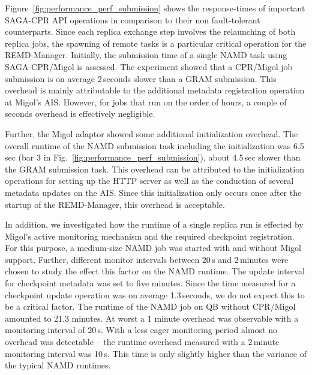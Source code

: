 \documentclass[conference,final]{IEEEtran}
\newcommand{\jhanote}[1]{ {\textcolor{red} { ***SJ: #1 }}}
\newcommand{\jhanote}[1]{}
\begin{document}
Figure~\ref{fig:performance_perf_submission} shows the response-times
of important SAGA-CPR API operations in comparison to their non
fault-tolerant counterparts. Since each replica exchange step involves
the relaunching of both replica jobs, the spawning of remote tasks is
a particular critical operation for the REMD-Manager.
Initially, the submission time of a single NAMD task
using SAGA-CPR/Migol is assessed. The experiment showed that a
CPR/Migol job submission is on average 2\,seconds slower than a 
GRAM submission. This overhead is mainly attributable to the
additional metadata registration operation at Migol's AIS. However,
for jobs that run on the order of hours, a couple of seconds overhead
is effectively negligible.

Further, the Migol adaptor showed some additional initialization
overhead. The overall runtime of the NAMD submission task
including the initialization was 6.5\,sec (bar 3 in
Fig.~\ref{fig:performance_perf_submission}), about 4.5\,sec slower than
the GRAM submission task. This overhead can be attributed to the
initialization operations for setting up the HTTP server as well as
the conduction of several metadata updates on the AIS. Since this
initialization only occurs once after the startup of the REMD-Manager,
this overhead is acceptable.
                                                                                                                    
In addition, we investigated how the runtime of
a single replica run is effected by Migol's active monitoring mechanism
and the required checkpoint registration. For this purpose, 
a medium-size NAMD job was started with and without
Migol support.  Further, different monitor intervals between 20\,s and
2\,minutes were chosen to study the effect this factor 
on the NAMD runtime.  The update interval for checkpoint
metadata was set to five minutes.  Since the time measured for a
checkpoint update operation was on average 1.3\,seconds, we do not
expect this to be a critical factor.  The runtime of the NAMD job on
QB without CPR/Migol amounted to 21.3 minutes.  At worst a 1
minute overhead was observable with a monitoring interval of
20\,s. With a less eager monitoring period almost no overhead was
detectable -- the runtime overhead measured with a 2\,minute
monitoring interval was 10\,s. This time is only slightly higher than
the variance of the typical NAMD runtimes.
\end{document}
